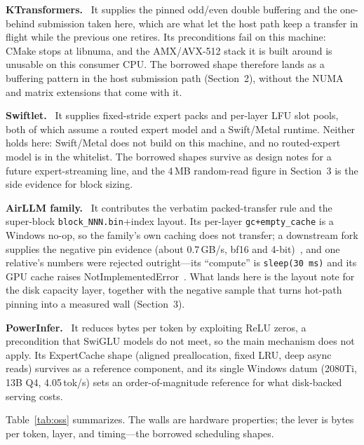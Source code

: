 \documentclass[letterpaper,twocolumn,10pt]{article}
\begin{document}
\textbf{KTransformers.}~\cite{ktransformers} It supplies the pinned odd/even
double buffering and the one-behind submission taken here, which are what let
the host path keep a transfer in flight while the previous one retires. Its
preconditions fail on this machine: CMake stops at libnuma, and the AMX/AVX-512
stack it is built around is unusable on this consumer CPU. The borrowed shape
therefore lands as a buffering pattern in the host submission path
(Section~2), without the NUMA and matrix extensions that come with it.

\textbf{Swiftlet.}~\cite{swiftlet} It supplies fixed-stride expert packs and
per-layer LFU slot pools, both of which assume a routed expert model and a
Swift/Metal runtime. Neither holds here: Swift/Metal does not build on this
machine, and no routed-expert model is in the whitelist. The borrowed shapes
survive as design notes for a future expert-streaming line, and the 4\,MB
random-read figure in Section~3 is the side evidence for block sizing.

\textbf{AirLLM family.}~\cite{airllm} It contributes the verbatim
packed-transfer rule and the super-block \texttt{block\_NNN.bin}+index layout.
Its per-layer \texttt{gc+empty\_cache} is a Windows no-op, so the family's own
caching does not transfer; a downstream fork supplies the negative pin evidence
(about 0.7\,GB/s, bf16 and 4-bit)~\cite{rabbitllm}, and one relative's numbers
were rejected outright---its ``compute'' is \texttt{sleep(30\,ms)} and its GPU
cache raises NotImplementedError~\cite{airllmplus}. What lands here is the
layout note for the disk capacity layer, together with the negative sample that
turns hot-path pinning into a measured wall (Section~3).

\textbf{PowerInfer.}~\cite{powerinfer2024,powerinfer} It reduces bytes per token
by exploiting ReLU zeros, a precondition that SwiGLU models do not meet, so the
main mechanism does not apply. Its ExpertCache shape (aligned preallocation,
fixed LRU, deep async reads) survives as a reference component, and its single
Windows datum (2080Ti, 13B Q4, 4.05\,tok/s) sets an order-of-magnitude
reference for what disk-backed serving costs.

Table~\ref{tab:oss} summarizes. The walls are hardware properties; the lever
is bytes per token, layer, and timing---the borrowed scheduling shapes.
\end{document}
